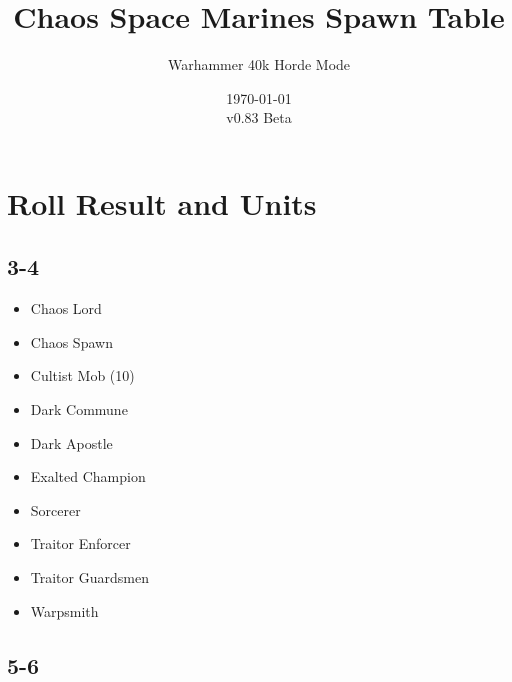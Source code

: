 \documentclass{HordeModeTarot}
\title{Chaos Space Marines Spawn Table}
\author{Warhammer 40k Horde Mode}
\date{\today \\v0.83 Beta}
\begin{document}
\maketitle

\outputUsingSpawnTableBoilerplate
\section{Roll Result and Units}\hypertarget{roll-results}{}\label{roll-results}

\begin{multicols}{2}

\subsection*{3-4}

\begin{itemize}[leftmargin=*]
\item[] Chaos Lord
\item[] Chaos Spawn
\item[] Cultist Mob (10)
\item[] Dark Commune
\item[] Dark Apostle
\item[] Exalted Champion
\item[] Sorcerer
\item[] Traitor Enforcer
\item[] Traitor Guardsmen
\item[] Warpsmith
\end{itemize}

\subsection*{5-6}


\end{multicols}
\end{document}
